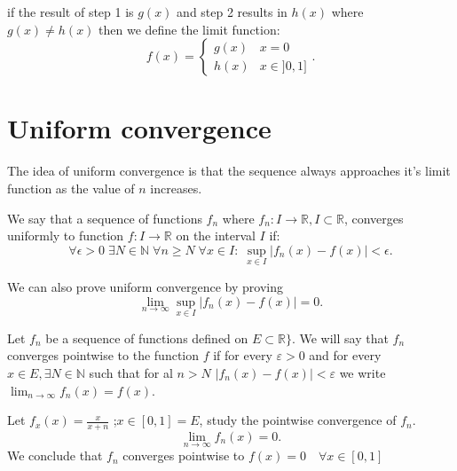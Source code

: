 \begin{remark}
    if the result of step 1 is $g(x)$ and step 2 results in $h(x)$ where $g(x)\neq h(x)$ then we define the limit function:
     \[
         f(x)=\begin{cases}g(x)&x=0\\h(x)&x\in ]0,1]\end{cases}
    .\] 
\end{remark}

\section{Uniform convergence}

The idea of uniform convergence is that the sequence always approaches it's limit function as the value of $n$ increases.

\begin{definition}
    We say that a sequence of functions $f_n$ where $f_n:I \to \mathbb{R},I\subset \mathbb{R}$, converges uniformly to function $f:I\to \mathbb{R}$ on the interval $I$ if:
    \[
        \forall \epsilon>0\;\exists N\in\mathbb{N}\;\forall n\ge N\;\forall x\in I: \; \sup_{x\in I} \left| f_n(x)-f(x) \right| <\epsilon
    .\]    
\end{definition}

\begin{remark}
    We can also prove uniform convergence by proving
    \[
        \lim_{n \to \infty}\sup_{x\in I} \left| f_n(x)-f(x) \right|=0 
    .\] 
\end{remark}


Let $f_n$ be a sequence of functions defined on $E\subset \mathbb{R}\}$. We will say that $f_n$ converges pointwise to the function $f$ if for every $\varepsilon>0$ and for every $x\in E, \exists N\in \mathbb{N}$ such that for al $n>N$ $\left|f_n(x) - f(x)\right|<\varepsilon$ we write $\lim_{n \to \infty} f_n(x)=f(x)$.
\begin{example}
    Let $f_x(x)=\frac{x}{x+n}$ ;$x\in[0,1]=E$, study the pointwise convergence of $f_n$.\\
    \[
    \lim_{n \to \infty}f_n(x) = 0 
    .\]
    We conclude that $f_n$ converges pointwise to $f(x)=0\quad \forall x\in[0,1]$
\end{example}

